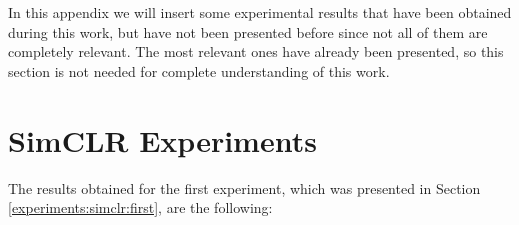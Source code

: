 
\label{APPENDIX:B}
In this appendix we will insert some experimental results that have been obtained during this work, but have not been presented before since not all of them are completely relevant.
The most relevant ones have already been presented, so this section is not needed for complete understanding of this work.
\section{SimCLR Experiments}

The results obtained for the first experiment, which was presented in Section \ref{experiments:simclr:first}, are the following:

\begin{table}[H]
    \label{table:experiment:first:simclr}
\centering
{}
\end{table}
